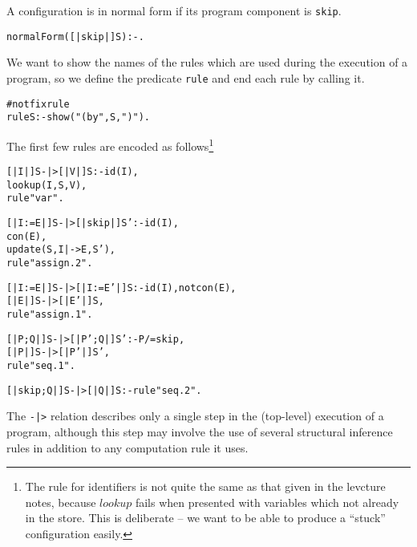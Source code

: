 \documentclass{article}
\newenvironment{smalltt}{\begin{small}\begin{alltt}}{\end{alltt}\end{small}}
\begin{document}
A configuration is in normal form if its program component is {\tt skip}. 
\begin{smalltt}
        normalForm([| skip |] S) :- .
\end{smalltt}

We want to show the names of the rules which are used during the execution of
a program, so we define the predicate {\tt rule} and 
end each rule by calling it.
\begin{smalltt}
        #notfix rule
        rule S :- show(" (by", S, ")").
\end{smalltt}

The first few rules are encoded as follows\footnote{The rule for identifiers is
not quite the same as that given in the levcture notes, because $lookup$
fails when presented with variables which not already in the store. This is deliberate -- we want to
be able to produce a ``stuck'' configuration easily.}
\begin{smalltt}
    [|  I       |] S        -|>    [|  V     |] S   :- id(I),  
                                                       lookup(I, S, V),
                                                       rule "var".
                                                      
    [|  I:=E    |] S        -|>    [|  skip  |] S'  :- id(I), 
                                                       con(E), 
                                                       update(S, I|->E, S'),
                                                       rule "assign.2".

    [|  I:=E    |] S        -|>    [|  I:=E' |] S   :- id(I), not con(E), 
                                                       [| E |] S -|> [| E' |] S,
                                                       rule "assign.1".
                                                       
    [|  P; Q    |] S        -|>    [|  P'; Q |] S'  :- P/=skip,
                                                       [| P |] S -|> [| P' |] S',
                                                       rule "seq.1".

    [|  skip; Q |] S        -|>    [|  Q     |] S   :- rule "seq.2".
\end{smalltt}

The {\tt -|>} relation describes only a single step in the (top-level)
execution of a program, although this step may involve the use of
several structural inference rules in addition to any computation rule
it uses. 
\end{document}
